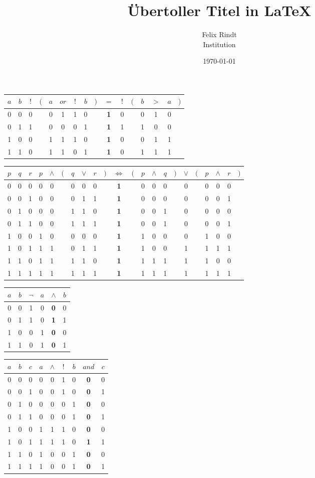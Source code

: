 \documentclass[11pt, landscape]{article}
\title{Übertoller Titel in \LaTeX}
\author{Felix Rindt\\ Institution}
\date{\today}}
\newcommand{\AND}{{\wedge}}
\newcommand{\OR}{{\vee}}
\newcommand{\AEQ}{{\Leftrightarrow}}
\begin{document}
\begin{tabular}{|c|c|cccccccccccccc|} \hline
$a$&$b$&$!$&$($&$a$&$or$&$!$&$b$&$)$&$=$&$!$&$($&$b$&$>$&$a$&$)$\tabularnewline\hline\hline
0&0&0&&0&1&1&0&&\textbf{1}&0&&0&1&0&\\\hline
0&1&1&&0&0&0&1&&\textbf{1}&1&&1&0&0&\\\hline
1&0&0&&1&1&1&0&&\textbf{1}&0&&0&1&1&\\\hline
1&1&0&&1&1&0&1&&\textbf{1}&0&&1&1&1&\\\hline
\end{tabular}

\vspace{1cm}

\begin{tabular}{|c|c|c|ccccccccccccccccccc|} \hline
$p$&$q$&$r$&$p$&$\AND$&$($&$q$&$\OR$&$r$&$)$&$\AEQ$&$($&$p$&$\AND$&$q$&$)$&$\OR$&$($&$p$&$\AND$&$r$&$)$\\\hline
0&0&0&0&0&&0&0&0&&\textbf{1}&&0&0&0&&0&&0&0&0&\\\hline
0&0&1&0&0&&0&1&1&&\textbf{1}&&0&0&0&&0&&0&0&1&\\\hline
0&1&0&0&0&&1&1&0&&\textbf{1}&&0&0&1&&0&&0&0&0&\\\hline
0&1&1&0&0&&1&1&1&&\textbf{1}&&0&0&1&&0&&0&0&1&\\\hline
1&0&0&1&0&&0&0&0&&\textbf{1}&&1&0&0&&0&&1&0&0&\\\hline
1&0&1&1&1&&0&1&1&&\textbf{1}&&1&0&0&&1&&1&1&1&\\\hline
1&1&0&1&1&&1&1&0&&\textbf{1}&&1&1&1&&1&&1&0&0&\\\hline
1&1&1&1&1&&1&1&1&&\textbf{1}&&1&1&1&&1&&1&1&1&\\\hline
\end{tabular}

\vspace{1cm}

\begin{tabular}{|c|c|cccc|} \hline
$a$&$b$&$\neg$&$a$&$\AND$&$b$\\\hline
0&0&1&0&\textbf{0}&0\\\hline
0&1&1&0&\textbf{1}&1\\\hline
1&0&0&1&\textbf{0}&0\\\hline
1&1&0&1&\textbf{0}&1\\\hline
\end{tabular}

\vspace{1cm}

\begin{tabular}{|c|c|c|cccccc|} \hline
$a$&$b$&$c$&$a$&$\AND$&$!$&$b$&$and$&$c$\\\hline
0&0&0&0&0&1&0&\textbf{0}&0\\\hline
0&0&1&0&0&1&0&\textbf{0}&1\\\hline
0&1&0&0&0&0&1&\textbf{0}&0\\\hline
0&1&1&0&0&0&1&\textbf{0}&1\\\hline
1&0&0&1&1&1&0&\textbf{0}&0\\\hline
1&0&1&1&1&1&0&\textbf{1}&1\\\hline
1&1&0&1&0&0&1&\textbf{0}&0\\\hline
1&1&1&1&0&0&1&\textbf{0}&1\\\hline
\end{tabular}
\end{document}
